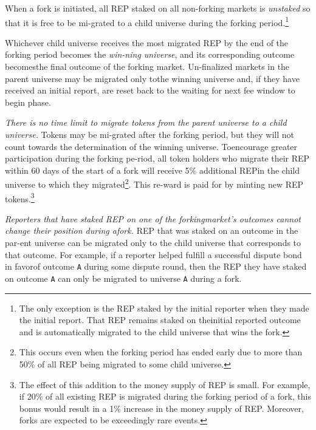\documentclass[12pt,floatfix,reprint,nofootinbib,amsmath,amssymb,epsfig,pre,floats,letterpaper,groupedaffiliation]{revtex4-1}
\theoremstyle{definition}
\theoremstyle{definition}
\begin{document}
When a fork is initiated, all REP staked on all non-forking markets is \textit{unstaked} so that it is free to be mi-\linebreak grated to a child universe during the forking period.\footnote{The only exception is the REP staked by the initial reporter when they made the initial report. That REP remains staked on the\linebreak initial reported outcome and is automatically migrated to the child universe that wins the fork.}

Whichever child universe receives the most migrated REP by the end of the forking period becomes the \textit{win-\linebreak ning universe}, and its corresponding outcome becomes\linebreak the final outcome of the forking market. Un-finalized\linebreak\vspace{\baselineskip}\vspace{0.3336\baselineskip} markets in the parent universe may be migrated only to\break\break the winning universe and, if they have received an initial report, are reset back to the waiting for next fee window to begin phase.

\textit{There is no time limit to migrate tokens from the par\-ent universe to a child universe.} Tokens may be mi-\linebreak grated after the forking period, but they will not count towards the determination of the winning universe. To\linebreak encourage greater participation during the forking pe-\linebreak riod, all token holders who migrate their REP within 60 days of the start of a fork will receive 5\% additional REP\linebreak in the child universe to which they migrated\footnote{This occurs even when the forking period has ended early due to more than 50\% of all REP being migrated to some child universe.}. This re-\linebreak ward is paid for by minting new REP tokens.\footnote{The effect of this addition to the money supply of REP is small. For example, if 20\% of all existing REP is migrated during the forking period of a fork, this bonus would result in a 1\% increase in the money supply of REP. Moreover, forks are expected to be exceedingly rare events.}

\textit{Reporters that have staked REP on one of the forking\linebreak market's outcomes cannot change their position during a\linebreak fork.} REP that was staked on an outcome in the par-\linebreak ent universe can be migrated only to the child universe that corresponds to that outcome. For example, if a re\-porter helped fulfill a successful dispute bond in favor\linebreak of outcome \texttt{A} during some dispute round, then the REP they have staked on outcome \texttt{A} can only be migrated to universe \texttt{A} during a fork.
\end{document}
